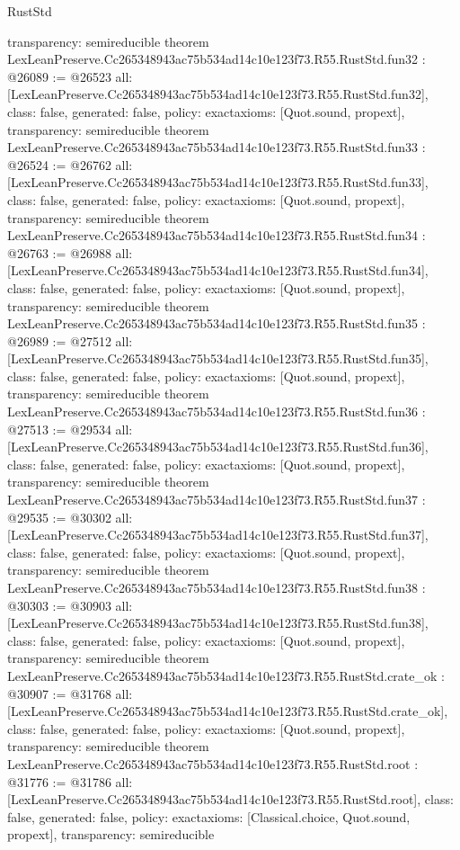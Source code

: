 \begin{lexlean}{RustStd}
\begin{coremodule}
{  transparency: semireducible
}
theorem LexLeanPreserve.Cc265348943ac75b534ad14c10e123f73.R55.RustStd.fun32 : @26089 := @26523 {
  all: [LexLeanPreserve.Cc265348943ac75b534ad14c10e123f73.R55.RustStd.fun32],
  class: false,
  generated: false,
  policy: exact{axioms: [Quot.sound, propext]},
  transparency: semireducible
}
theorem LexLeanPreserve.Cc265348943ac75b534ad14c10e123f73.R55.RustStd.fun33 : @26524 := @26762 {
  all: [LexLeanPreserve.Cc265348943ac75b534ad14c10e123f73.R55.RustStd.fun33],
  class: false,
  generated: false,
  policy: exact{axioms: [Quot.sound, propext]},
  transparency: semireducible
}
theorem LexLeanPreserve.Cc265348943ac75b534ad14c10e123f73.R55.RustStd.fun34 : @26763 := @26988 {
  all: [LexLeanPreserve.Cc265348943ac75b534ad14c10e123f73.R55.RustStd.fun34],
  class: false,
  generated: false,
  policy: exact{axioms: [Quot.sound, propext]},
  transparency: semireducible
}
theorem LexLeanPreserve.Cc265348943ac75b534ad14c10e123f73.R55.RustStd.fun35 : @26989 := @27512 {
  all: [LexLeanPreserve.Cc265348943ac75b534ad14c10e123f73.R55.RustStd.fun35],
  class: false,
  generated: false,
  policy: exact{axioms: [Quot.sound, propext]},
  transparency: semireducible
}
theorem LexLeanPreserve.Cc265348943ac75b534ad14c10e123f73.R55.RustStd.fun36 : @27513 := @29534 {
  all: [LexLeanPreserve.Cc265348943ac75b534ad14c10e123f73.R55.RustStd.fun36],
  class: false,
  generated: false,
  policy: exact{axioms: [Quot.sound, propext]},
  transparency: semireducible
}
theorem LexLeanPreserve.Cc265348943ac75b534ad14c10e123f73.R55.RustStd.fun37 : @29535 := @30302 {
  all: [LexLeanPreserve.Cc265348943ac75b534ad14c10e123f73.R55.RustStd.fun37],
  class: false,
  generated: false,
  policy: exact{axioms: [Quot.sound, propext]},
  transparency: semireducible
}
theorem LexLeanPreserve.Cc265348943ac75b534ad14c10e123f73.R55.RustStd.fun38 : @30303 := @30903 {
  all: [LexLeanPreserve.Cc265348943ac75b534ad14c10e123f73.R55.RustStd.fun38],
  class: false,
  generated: false,
  policy: exact{axioms: [Quot.sound, propext]},
  transparency: semireducible
}
theorem LexLeanPreserve.Cc265348943ac75b534ad14c10e123f73.R55.RustStd.crate_ok : @30907 := @31768 {
  all: [LexLeanPreserve.Cc265348943ac75b534ad14c10e123f73.R55.RustStd.crate_ok],
  class: false,
  generated: false,
  policy: exact{axioms: [Quot.sound, propext]},
  transparency: semireducible
}
theorem LexLeanPreserve.Cc265348943ac75b534ad14c10e123f73.R55.RustStd.root : @31776 := @31786 {
  all: [LexLeanPreserve.Cc265348943ac75b534ad14c10e123f73.R55.RustStd.root],
  class: false,
  generated: false,
  policy: exact{axioms: [Classical.choice, Quot.sound, propext]},
  transparency: semireducible
}


\end{coremodule}
\end{lexlean}
